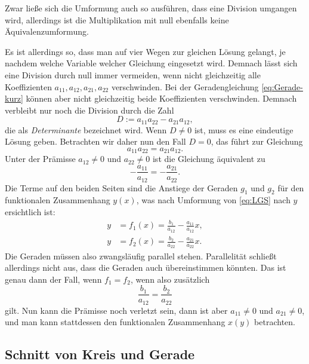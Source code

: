 Zwar ließe sich die Umformung auch so ausführen, dass eine Division
umgangen wird, allerdings ist die Multiplikation mit null ebenfalls
keine Äquivalenzumformung.

Es ist allerdings so, dass man auf vier Wegen zur gleichen Lösung
gelangt, je nachdem welche Variable welcher Gleichung eingesetzt
wird. Demnach lässt sich eine Division durch null immer vermeiden,
wenn nicht gleichzeitig alle Koeffizienten
$a_{11}, a_{12}, a_{21}, a_{22}$
verschwinden. Bei der Geradengleichung \eqref{eq:Gerade-kurz}
können aber nicht gleichzeitig beide Koeffizienten verschwinden.
Demnach verbleibt nur noch die Division durch die Zahl%
\begin{equation}
D := a_{11}a_{22}-a_{21}a_{12},
\end{equation}
die als \emph{Determinante} bezeichnet wird. Wenn $D\ne 0$ ist,
muss es eine eindeutige Lösung geben. Betrachten wir daher
nun den Fall $D=0$, das führt zur Gleichung%
\begin{equation}
a_{11}a_{22} = a_{21}a_{12}.
\end{equation}
Unter der Prämisse $a_{12}\ne 0$ und $a_{22}\ne 0$ ist die Gleichung
äquivalent zu%
\begin{equation}
-\frac{a_{11}}{a_{12}} = -\frac{a_{21}}{a_{22}}.
\end{equation}
Die Terme auf den beiden Seiten sind die Anstiege der Geraden
$g_1$ und $g_2$ für den funktionalen Zusammenhang $y(x)$, was
nach Umformung von \eqref{eq:LGS} nach $y$ ersichtlich ist:%
\begin{align}
y &= f_1(x) = \frac{b_1}{a_{12}} - \frac{a_{11}}{a_{12}}x,\\
y &= f_2(x) = \frac{b_2}{a_{22}} - \frac{a_{21}}{a_{22}}x.
\end{align}
Die Geraden müssen also zwangsläufig parallel stehen. Parallelität
schließt allerdings nicht aus, dass die Geraden auch übereinstimmen
könnten. Das ist genau dann der Fall, wenn $f_1=f_2$, wenn also
zusätzlich%
\begin{equation}
\frac{b_1}{a_{12}} = \frac{b_2}{a_{22}}
\end{equation}
gilt. Nun kann die Prämisse noch verletzt sein, dann ist aber
$a_{11}\ne 0$ und $a_{21}\ne 0$, und man kann stattdessen den
funktionalen Zusammenhang $x(y)$ betrachten.

\subsection{Schnitt von Kreis und Gerade}

